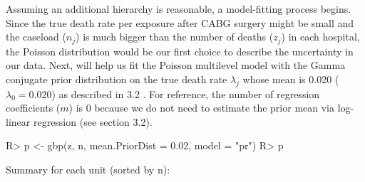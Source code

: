 \documentclass[article]{jss}
\begin{document}
Assuming an additional hierarchy is reasonable, a model-fitting process begins.  Since the true death rate per exposure after CABG surgery might be small and the caseload ($n_{j}$) is much bigger than the number of deaths ($z_{j}$) in each hospital, the Poisson distribution would be our first choice to describe the uncertainty in our data. Next,  will help us fit the Poisson multilevel model with the Gamma conjugate prior distribution on the true death rate $\lambda_{j}$ whose mean is 0.020 ($\lambda_{0}=0.020$) as described in 3.2 . For reference, the number of regression coefficients ($m$) is 0 because we do not need to estimate the prior mean via log-linear regression (see section 3.2).
\begin{CodeChunk}
\begin{CodeInput}
R> p <- gbp(z, n, mean.PriorDist = 0.02, model = "pr")
R> p
\end{CodeInput}
\begin{CodeOutput}
Summary for each unit (sorted by n):


\end{CodeOutput}
\end{CodeChunk}
\end{document}
